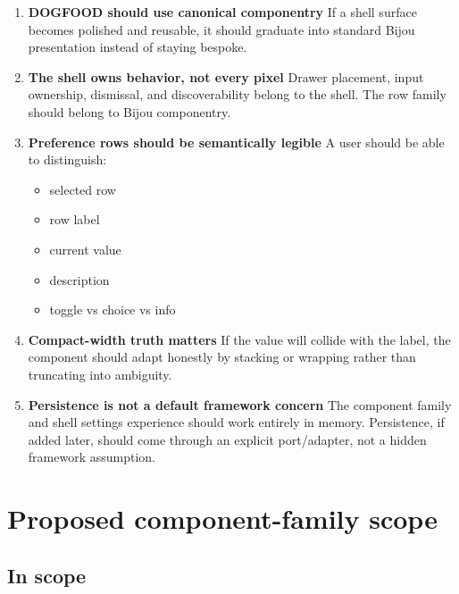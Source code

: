 \begin{enumerate}
\def\labelenumi{\arabic{enumi}.}
\item
  \textbf{DOGFOOD should use canonical componentry} If a shell surface becomes polished and reusable, it should graduate into standard Bijou presentation instead of staying bespoke.
\item
  \textbf{The shell owns behavior, not every pixel} Drawer placement, input ownership, dismissal, and discoverability belong to the shell. The row family should belong to Bijou componentry.
\item
  \textbf{Preference rows should be semantically legible} A user should be able to distinguish:

  \begin{itemize}
  \tightlist
  \item
    selected row
  \item
    row label
  \item
    current value
  \item
    description
  \item
    toggle vs choice vs info
  \end{itemize}
\item
  \textbf{Compact-width truth matters} If the value will collide with the label, the component should adapt honestly by stacking or wrapping rather than truncating into ambiguity.
\item
  \textbf{Persistence is not a default framework concern} The component family and shell settings experience should work entirely in memory. Persistence, if added later, should come through an explicit port/adapter, not a hidden framework assumption.
\end{enumerate}

\section{Proposed component-family scope}\label{record-054-proposed-component-family-scope}

\subsection{In scope}\label{record-054-in-scope}


